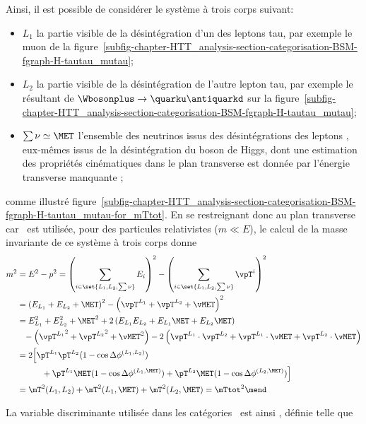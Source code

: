 \par
Ainsi, il est possible de considérer le système à trois corps suivant:
\begin{itemize}
\item $L_1$ la partie visible de la désintégration d'un des leptons tau, par exemple le muon de la figure~\ref{subfig-chapter-HTT_analysis-section-categorisation-BSM-fgraph-H-tautau_mutau};
\item $L_2$ la partie visible de la désintégration de l'autre lepton tau, par exemple le \tauh résultant de $\Wbosonplus\to\quarku\antiquarkd$ sur la figure~\ref{subfig-chapter-HTT_analysis-section-categorisation-BSM-fgraph-H-tautau_mutau};
\item $\sum\nu\simeq\MET$ l'ensemble des neutrinos issus des désintégrations des leptons \tau, eux-mêmes issus de la désintégration du boson de Higgs, dont une estimation des propriétés cinématiques dans le plan transverse est donnée par l'énergie transverse manquante \vMET;
\end{itemize}
comme illustré figure~\ref{subfig-chapter-HTT_analysis-section-categorisation-BSM-fgraph-H-tautau_mutau-for_mTtot}.
En se restreignant donc au plan transverse car \MET\ est utilisée,
pour des particules relativistes ($m\ll E$),
le calcul de la \og masse invariante \fg{} de ce système à trois corps donne
\begin{align}
m^2 &= E^2 - p^2
= \left( \sum_{i \in \set{L_1,L_2,\sum\nu}} E_i \right)^2 - \left( \sum_{i \in \set{L_1,L_2,\sum\nu}} \vpT^i \right)^2
\nonumber\\
&= \left( E_{L_1} + E_{L_2} + \MET \right)^2 - \left( \vpT^{L_1} + \vpT^{L_2} + \vMET \right)^2
\nonumber\\
&= E_{L_1}^2 + E_{L_2}^2 + \MET^2 + 2 \left( E_{L_1}E_{L_2} + E_{L_1}\MET + E_{L_2}\MET \right)
\nonumber\\
&\hphantom{=} - \left( {\vpT^{L_1}}^2 + {\vpT^{L_2}}^2 + {\vMET}^2 \right) - 2 \left( \vpT^{L_1}\cdot\vpT^{L_2} + \vpT^{L_1}\cdot\vMET + \vpT^{L_2}\cdot\vMET \right)
\nonumber\\
&= 2 \Big[ \pT^{L_1}\pT^{L_2}(1-\cos\Delta\phi^{(L_1,L_2)})
\nonumber\\
&\hphantom{=2(} \quad + \pT^{L_1}\MET(1-\cos\Delta\phi^{(L_1,\MET)}) + \pT^{L_2}\MET(1-\cos\Delta\phi^{(L_2,\MET)}) \Big]
\nonumber\\
&= \mT^2 (L_1,L_2) + \mT^2 (L_1,\MET) + \mT^2 (L_2,\MET) = {\mTtot}^2
\mend
\end{align}
\par
La variable discriminante utilisée dans les catégories \CATbsm\ est ainsi \mTtot, définie telle que
